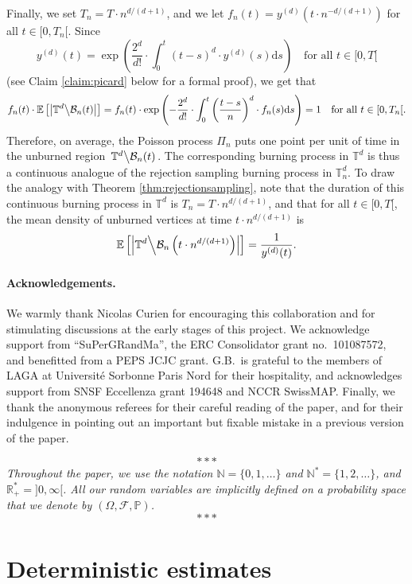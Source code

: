 \documentclass[a4paper,11pt]{article}
\begin{document}
Finally, we set $T_n=T\cdot n^{d/(d+1)}$, and we let $f_n(t)=y^{(d)}\left(t\cdot n^{-d/(d+1)}\right)$ for all $t\in[0,T_n[$.
Since
\[y^{(d)}(t)=\exp\left(\frac{2^d}{d!}\cdot\int_0^t(t-s)^d\cdot y^{(d)}(s)\mathrm{d}s\right)\quad\text{for all $t\in[0,T[$}\]
(see Claim \ref{claim:picard} below for a formal proof), we get that
\[f_n(t)\cdot\mathbb{E}\left[\left|\mathbb{T}^d\middle\backslash\mathcal{B}_n(t)\right|\right]=f_n(t)\cdot\exp\left(-\frac{2^d}{d!}\cdot\int_0^t\left(\frac{t-s}{n}\right)^d\cdot f_n(s)\mathrm{d}s\right)=1\quad\text{for all $t\in[0,T_n[$.}\]
Therefore, on average, the Poisson process $\Pi_n$ puts one point per unit of time in the unburned region $\left.\mathbb{T}^d\middle\backslash\mathcal{B}_n(t)\right.$.
The corresponding burning process in $\mathbb{T}^d$ is thus a continuous analogue of the rejection sampling burning process in $\mathbb{T}_n^d$.
To draw the analogy with Theorem \ref{thm:rejectionsampling}, note that the duration of this continuous burning process in $\mathbb{T}^d$ is $T_n=T\cdot n^{d/(d+1)}$, and that for all $t\in[0,T[$, the mean density of unburned vertices at time $t\cdot n^{d/(d+1)}$ is
\[\mathbb{E}\left[\left|\mathbb{T}^d\middle\backslash\mathcal{B}_n\left(t\cdot n^{d/(d+1)}\right)\right|\right]=\frac{1}{y^{(d)}(t)}.\]

\paragraph{Acknowledgements.}
We warmly thank Nicolas Curien for encouraging this collaboration and for stimulating discussions at the early stages of this project.
We acknowledge support from ``SuPerGRandMa'', the ERC Consolidator grant no.~101087572, and benefitted from a PEPS JCJC grant.
G.B.~is grateful to the members of LAGA at Université Sorbonne Paris Nord for their hospitality, and acknowledges support from SNSF Eccellenza grant 194648 and NCCR SwissMAP.
Finally, we thank the anonymous referees for their careful reading of the paper, and for their indulgence in pointing out an important but fixable mistake in a previous version of the paper.

\[***\]
\emph{Throughout the paper, we use the notation $\mathbb{N}=\{0,1,\ldots\}$ and $\mathbb{N}^*=\{1,2,\ldots\}$, and $\mathbb{R}_+^*={]0,\infty[}$.
All our random variables are implicitly defined on a probability space that we denote by $(\Omega,\mathcal{F},\mathbb{P})$.}
\[***\]

\section{Deterministic estimates}\label{sec:detbounds}
\end{document}
